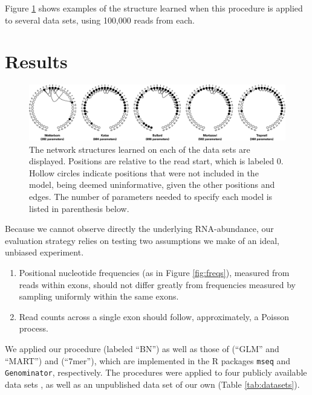 \documentclass{bioinfo}
\begin{document}
Figure \ref{fig:models} shows examples of the structure learned when this
procedure is applied to several data sets, using 100,000 reads from each.


\section{Results}

\begin{figure}
\centerline{\includegraphics[width=\textwidth]{models.eps}}
\caption{
The network structures learned on each of the data sets are displayed. Positions
are relative to the read start, which is labeled 0. Hollow circles indicate
positions that were not included in the model, being deemed uninformative, given
the other positions and edges. The number of parameters needed to
specify each model is listed in parenthesis below.}
\label{fig:models}
\end{figure}


Because we cannot observe directly the underlying RNA-abundance, our evaluation
strategy relies on testing two assumptions we make of an ideal, unbiased experiment.
\begin{enumerate}
\item Positional nucleotide frequencies (as in Figure \ref{fig:freqs}), measured
from reads within exons, should not differ greatly from frequencies measured by
sampling uniformly within the same exons.
\item Read counts across a single exon should follow, approximately, a Poisson
process.
\end{enumerate}

We applied our procedure (labeled ``BN'') as well as those of
\citet{Li2010} (``GLM'' and ``MART'') and \citet{Hansen2010} (``7mer''), which
are implemented in the R packages \texttt{mseq} and \texttt{Genominator},
respectively. The procedures were applied to four publicly available data
sets \citep{Bullard2010, Mortazavi2008, Trapnell2010, Wetterbom2010}, as well as
an unpublished data set of our own (Table \ref{tab:datasets}).
\end{document}
